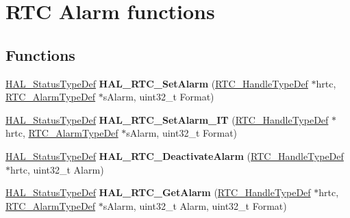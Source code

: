 \hypertarget{group___r_t_c___exported___functions___group3}{}\section{R\+TC Alarm functions}
\label{group___r_t_c___exported___functions___group3}
\subsection*{Functions}
\begin{DoxyCompactItemize}
\item 
\mbox{\label{group___r_t_c___exported___functions___group3_gafd78015b93b16dcb9e41a4655a7ea972}} 
\hyperlink{stm32f0xx__hal__def_8h_a63c0679d1cb8b8c684fbb0632743478f}{H\+A\+L\+\_\+\+Status\+Type\+Def} {\bfseries H\+A\+L\+\_\+\+R\+T\+C\+\_\+\+Set\+Alarm} (\hyperlink{struct_r_t_c___handle_type_def}{R\+T\+C\+\_\+\+Handle\+Type\+Def} $\ast$hrtc, \hyperlink{struct_r_t_c___alarm_type_def}{R\+T\+C\+\_\+\+Alarm\+Type\+Def} $\ast$s\+Alarm, uint32\+\_\+t Format)
\item 
\mbox{\label{group___r_t_c___exported___functions___group3_gab66a7fec05e9d9374de95d5f61e16c16}} 
\hyperlink{stm32f0xx__hal__def_8h_a63c0679d1cb8b8c684fbb0632743478f}{H\+A\+L\+\_\+\+Status\+Type\+Def} {\bfseries H\+A\+L\+\_\+\+R\+T\+C\+\_\+\+Set\+Alarm\+\_\+\+IT} (\hyperlink{struct_r_t_c___handle_type_def}{R\+T\+C\+\_\+\+Handle\+Type\+Def} $\ast$hrtc, \hyperlink{struct_r_t_c___alarm_type_def}{R\+T\+C\+\_\+\+Alarm\+Type\+Def} $\ast$s\+Alarm, uint32\+\_\+t Format)
\item 
\mbox{\label{group___r_t_c___exported___functions___group3_ga186d852f8aee8a4d0dfeec778be35482}} 
\hyperlink{stm32f0xx__hal__def_8h_a63c0679d1cb8b8c684fbb0632743478f}{H\+A\+L\+\_\+\+Status\+Type\+Def} {\bfseries H\+A\+L\+\_\+\+R\+T\+C\+\_\+\+Deactivate\+Alarm} (\hyperlink{struct_r_t_c___handle_type_def}{R\+T\+C\+\_\+\+Handle\+Type\+Def} $\ast$hrtc, uint32\+\_\+t Alarm)
\item 
\mbox{\label{group___r_t_c___exported___functions___group3_ga4786b652ffee2d59da2c65dd78646405}} 
\hyperlink{stm32f0xx__hal__def_8h_a63c0679d1cb8b8c684fbb0632743478f}{H\+A\+L\+\_\+\+Status\+Type\+Def} {\bfseries H\+A\+L\+\_\+\+R\+T\+C\+\_\+\+Get\+Alarm} (\hyperlink{struct_r_t_c___handle_type_def}{R\+T\+C\+\_\+\+Handle\+Type\+Def} $\ast$hrtc, \hyperlink{struct_r_t_c___alarm_type_def}{R\+T\+C\+\_\+\+Alarm\+Type\+Def} $\ast$s\+Alarm, uint32\+\_\+t Alarm, uint32\+\_\+t Format)

\end{DoxyCompactItemize}
